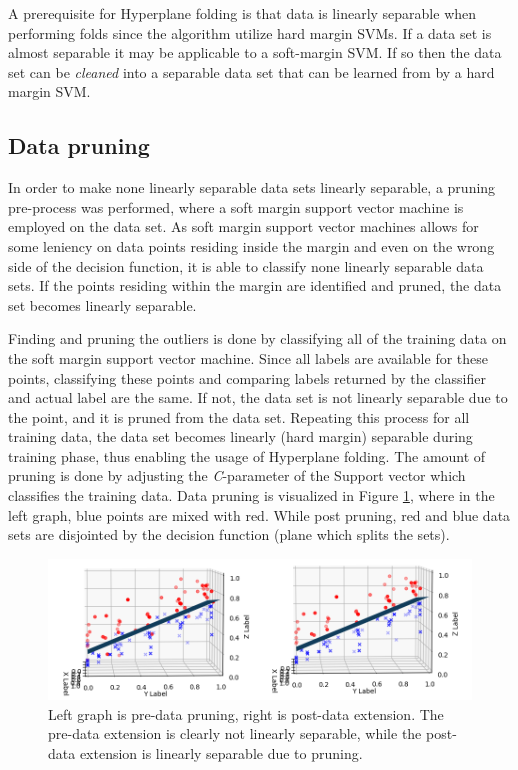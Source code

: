 \documentclass[a4paper,twoside]{bth}
\begin{document}
\par A prerequisite for Hyperplane folding is that data is linearly separable when performing folds since the algorithm utilize hard margin SVMs. If a data set is almost separable it may be applicable to a soft-margin SVM. If so then the data set can be \textit{cleaned} into a separable data set that can be learned from by a hard margin SVM.

\subsection{Data pruning}
In order to make none linearly separable data sets linearly separable, a pruning pre-process was performed, where a soft margin support vector machine is employed on the data set. As soft margin support vector machines allows for some leniency on data points residing inside the margin and even on the wrong side of the decision function, it is able to classify none linearly separable data sets. If the points residing within the margin are identified and pruned, the data set becomes linearly separable.\par
Finding and pruning the outliers is done by classifying all of the training data on the soft margin support vector machine. Since all labels are available for these points, classifying these points and comparing  labels returned by the classifier and actual label are the same. If not, the data set is not linearly separable due to the point, and it is pruned from the data set. Repeating this process for all training data, the data set becomes linearly (hard margin) separable during training phase, thus enabling the usage of Hyperplane folding. The amount of pruning is done by adjusting the \textit{C}-parameter of the Support vector which classifies the training data. Data pruning is visualized in Figure \ref{fig:prune}, where in the left graph, blue points are mixed with red. While post pruning, red and blue data sets are disjointed by the decision function (plane which splits the sets).

\begin{figure}
\centering
\includegraphics[scale=0.75]{images/metod-images/clean.png}
   \caption{Left graph is pre-data pruning, right is post-data extension. The pre-data extension is clearly not linearly separable, while the post-data extension is linearly separable due to pruning. }
   \label{fig:prune}
\end{figure}
\end{document}
